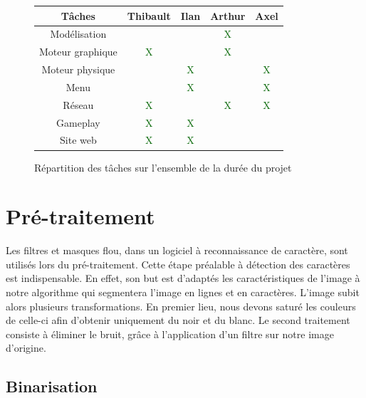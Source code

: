 \documentclass[11pt]{report}
\begin{document}
\begin{figure}[htbp]
\centering
\begin{tabular}{ | c || c | c | c | c | }
\hline Tâches & Thibault & Ilan & Arthur & Axel \\
\hline Modélisation & & & \textcolor{darkgreen}{X} & \\
\hline Moteur graphique & \textcolor{darkgreen}{X} & & \textcolor{darkgreen}{X} & \\
\hline Moteur physique & & \textcolor{darkgreen}{X} & & \textcolor{darkgreen}{X} \\
\hline Menu & & \textcolor{darkgreen}{X} & & \textcolor{darkgreen}{X} \\
\hline Réseau & \textcolor{darkgreen}{X} & & \textcolor{darkgreen}{X} & \textcolor{darkgreen}{X} \\
\hline Gameplay & \textcolor{darkgreen}{X} & \textcolor{darkgreen}{X} & & \\
\hline Site web & \textcolor{darkgreen}{X} & \textcolor{darkgreen}{X} & & \\
\hline
\end{tabular}
\caption{Répartition des tâches sur l'ensemble de la durée du projet}
\label{tab}
\end{figure}


\chapter{Pré-traitement}

Les filtres et masques flou, dans un logiciel à reconnaissance de caractère, sont utilisés lors du pré-traitement. Cette étape préalable à détection des caractères est indispensable. En effet, son but est d’adaptés les caractéristiques de l'image à notre algorithme qui segmentera l'image en lignes et en caractères. L'image subit alors plusieurs transformations. En premier lieu, nous devons saturé les couleurs de celle-ci afin d'obtenir uniquement du noir et du blanc. Le second traitement consiste à éliminer le bruit, grâce à l'application d'un filtre sur notre image d'origine.

\section{Binarisation}
\end{document}
